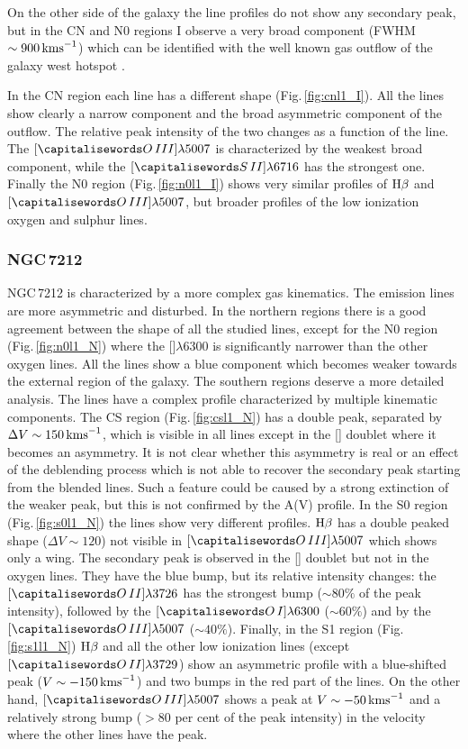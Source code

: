 \documentclass[../main.tex]{subfiles}
\begin{document}
On the other side of the galaxy the line profiles do not show any secondary peak, but in the CN and N0 regions I observe a very broad component (FWHM$\sim 900\,\si{\kms}$) which can be identified with the well known gas outflow of the galaxy west hotspot \citep[e.g.][]{Morganti07,Morganti15,Dasyra15}.

In the CN region each line has a different shape (Fig.\,\ref{fig:cnl1_I}).
All the lines show clearly a narrow component and the broad asymmetric component of the outflow.
The relative peak intensity of the two changes as a function of the line.
The $[\ion{O}{III}]\lambda5007$ is characterized by the weakest broad component, while the $[\ion{S}{II}]\lambda6716$ has the strongest one.
Finally the N0 region (Fig.\,\ref{fig:n0l1_I}) shows very similar profiles of $\Hb$ and $[\ion{O}{III}]\lambda5007$, but broader profiles of the low ionization oxygen and sulphur lines.


\subsubsection{NGC\,7212}
NGC\,7212 is characterized by a more complex gas kinematics.
The emission lines are more asymmetric and disturbed.
In the northern regions there is a good agreement between the shape of all the studied lines, except for the N0 region (Fig.\,\ref{fig:n0l1_N}) where the []$\lambda6300$ is significantly narrower than the other oxygen lines.
All the lines show a blue component which becomes weaker towards the external region of the galaxy.
The southern regions deserve a more detailed analysis.
The lines have a complex profile characterized by multiple kinematic components.
The CS region (Fig.\,\ref{fig:csl1_N}) has a double peak, separated by $\Delta V\sim 150\,\si{\kms}$, which is visible in all lines except in the [] doublet where it becomes an asymmetry.
It is not clear whether this asymmetry is real or an effect of the deblending process which is not able to recover the secondary peak starting from the blended lines.
Such a feature could be caused by a strong extinction of the weaker peak, but this is not confirmed by the A(V) profile.
In the S0 region (Fig.\,\ref{fig:s0l1_N}) the lines show very different profiles.
$\Hb$ has a double peaked shape ($\Delta V\sim 120$) not visible in $[\ion{O}{III}]\lambda5007$ which shows only a wing.
The secondary peak is observed in the [] doublet but not in the oxygen lines.
They have the blue bump, but its relative intensity changes: the $[\ion{O}{II}]\lambda3726$ has the strongest bump ($\sim80\%$ of the peak intensity), followed by the $[\ion{O}{I}]\lambda6300$ ($\sim60\%$) and by the $[\ion{O}{III}]\lambda5007$ ($\sim40\%$).
Finally, in the S1 region (Fig.\,\ref{fig:s1l1_N}) $\Hb$ and all the other low ionization lines (except $[\ion{O}{II}]\lambda3729$) show an asymmetric profile with a blue-shifted peak ($V\sim-150\,\si{\kms}$) and two bumps in the red part of the lines.
On the other hand, $[\ion{O}{III}]\lambda5007$ shows a peak at $V\sim -50\,\si{\kms}$ and a relatively strong bump ($>80$ per cent of the peak intensity) in the velocity where the other lines have the peak.
\end{document}
